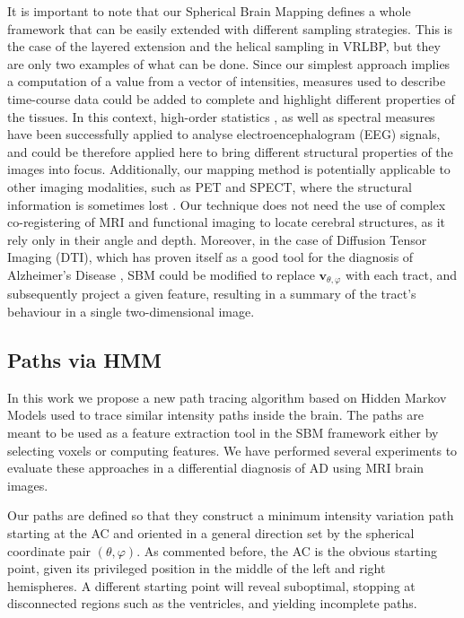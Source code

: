 It is important to note that our Spherical Brain Mapping defines a whole framework that can be easily extended with different sampling strategies. This is the case of the layered extension and the helical sampling in VRLBP, but they are only two examples of what can be done. 
Since our simplest approach implies a computation of a value from a vector of intensities, measures used to describe time-course data could be added to complete and highlight different properties of the tissues. In this context, high-order statistics \cite{Zhou2008}, as well as spectral measures \cite{Locatelli1998} have been successfully applied to analyse electroencephalogram (EEG) signals, and could be therefore applied here to bring different structural properties of the images into focus. 
Additionally, our mapping method is potentially applicable to other imaging modalities, such as PET and SPECT, where the structural information is sometimes lost \cite{IAIllan2010,Ram'irez2009}. Our technique does not need the use of complex co-registering of MRI and functional imaging to locate cerebral structures, as it rely only in their angle and depth. Moreover, in the case of Diffusion Tensor Imaging (DTI), which has proven itself as a good tool for the diagnosis of Alzheimer's Disease \cite{Grana2011,Medina2008}, \ac{SBM} could be modified to replace $\mathbf{v}_{\theta,\varphi}$ with each tract, and subsequently project a given feature, resulting in a summary of the tract's behaviour in a single two-dimensional image. 

			

\subsection{Paths via \ac{HMM}}\label{sec:discussion}
In this work we propose a new path tracing algorithm based on Hidden Markov Models used to trace similar intensity paths inside the brain. The paths are meant to be used as a feature extraction tool in the \ac{SBM} framework either by selecting voxels or computing features. We have performed several experiments to evaluate these approaches in a differential diagnosis of AD using MRI brain images. 

Our paths are defined so that they construct a minimum intensity variation path starting at the AC and oriented in a general direction set by the spherical coordinate pair $(\theta,\varphi)$. As commented before, the AC is the obvious starting point, given its privileged position in the middle of the left and right hemispheres. A different starting point will reveal suboptimal, stopping at disconnected regions such as the ventricles, and yielding incomplete paths. 

